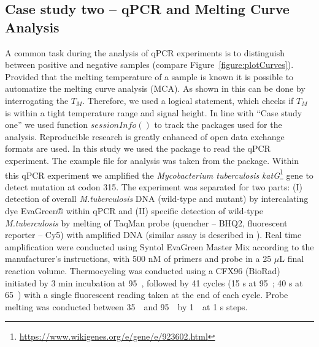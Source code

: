 \subsection{Case study two -- qPCR and Melting Curve Analysis}

A common task during the analysis of qPCR experiments is to distinguish between 
positive and negative samples (compare Figure~\ref{figure:plotCurves}). 
Provided 
that the melting temperature of a sample is known it is possible to automatize 
the melting curve analysis (MCA). As shown in \citet{roediger_RJ_2013} this can 
be done by interrogating the $T_{M}$. Therefore, we used a logical 
statement, 
which checks if $T_{M}$ is within a tight temperature range and signal height. 
In line 
with ``Case study one'' we used function $sessionInfo()$ to track the packages 
used 
for the analysis. Reproducible research is greatly enhanced of open data 
exchange formats are used. In this study we used the  package to 
read the qPCR experiment. The example file  for 
analysis was taken from the  package. Within this qPCR experiment 
we amplified the \textit{Mycobacterium tuberculosis} 
\textit{katG}\footnote{\url{https://www.wikigenes.org/e/gene/e/923602.html}} 
gene to detect mutation at codon 315. The experiment was separated for two 
parts: 
(I) detection of overall \textit{M.tuberculosis} DNA (wild-type and mutant) by 
intercalating dye EvaGreen® within qPCR and (II) specific detection of 
wild-type 
\textit{M.tuberculosis} by melting of TaqMan probe (quencher -- BHQ2, 
fluorescent reporter -- Cy5) with amplified DNA (similar assay is described in 
\citet{luo_multiplex_2011}). Real time amplification were conducted using 
Syntol 
EvaGreen Master Mix according to the manufacturer's instructions, with 500 nM 
of 
primers and probe in a 25 $\mu$L final reaction volume. Thermocycling was 
conducted using a CFX96 (BioRad) initiated by 3 min incubation at 
95~\textcelsius, followed by 41 cycles (15 s at 95~\textcelsius; 40 s at 
65~\textcelsius) with a single fluorescent reading taken at the end of each 
cycle. Probe melting was conducted between 35~\textcelsius~and 
95~\textcelsius~by 1~\textcelsius~at 1 s steps.
